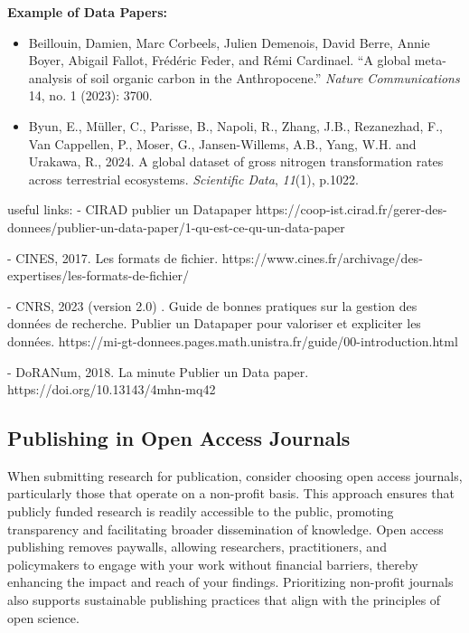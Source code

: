 \documentclass[
]{book}
\newenvironment{Shaded}{\begin{snugshade}}{\end{snugshade}}
\newcommand{\NormalTok}[1]{#1}
\begin{document}
\textbf{Example of Data Papers:}

\begin{itemize}
\item
  Beillouin, Damien, Marc Corbeels, Julien Demenois, David Berre, Annie Boyer, Abigail Fallot, Frédéric Feder, and Rémi Cardinael.
  ``A global meta-analysis of soil organic carbon in the Anthropocene.'' \emph{Nature Communications} 14, no. 1 (2023): 3700.
\item
  Byun, E., Müller, C., Parisse, B., Napoli, R., Zhang, J.B., Rezanezhad, F., Van Cappellen, P., Moser, G., Jansen-Willems, A.B., Yang, W.H.
  and Urakawa, R., 2024.
  A global dataset of gross nitrogen transformation rates across terrestrial ecosystems.
  \emph{Scientific Data}, \emph{11}(1), p.1022.
\end{itemize}

\begin{Shaded}
\begin{Highlighting}[]
\NormalTok{useful links: }
\NormalTok{{-}   CIRAD publier un Datapaper https://coop{-}ist.cirad.fr/gerer{-}des{-}donnees/publier{-}un{-}data{-}paper/1{-}qu{-}est{-}ce{-}qu{-}un{-}data{-}paper }

\NormalTok{{-}   CINES, 2017. Les formats de fichier. https://www.cines.fr/archivage/des{-}expertises/les{-}formats{-}de{-}fichier/}

\NormalTok{{-}   CNRS, 2023 (version 2.0) . Guide de bonnes pratiques sur la gestion des données de recherche. Publier un Datapaper pour valoriser et expliciter les données. https://mi{-}gt{-}donnees.pages.math.unistra.fr/guide/00{-}introduction.html}

\NormalTok{{-}   DoRANum, 2018. La minute Publier un Data paper. https://doi.org/10.13143/4mhn{-}mq42}
\end{Highlighting}
\end{Shaded}

\subsection{Publishing in Open Access Journals}\label{publishing-in-open-access-journals}

When submitting research for publication, consider choosing open access journals, particularly those that operate on a non-profit basis.
This approach ensures that publicly funded research is readily accessible to the public, promoting transparency and facilitating broader dissemination of knowledge.
Open access publishing removes paywalls, allowing researchers, practitioners, and policymakers to engage with your work without financial barriers, thereby enhancing the impact and reach of your findings.
Prioritizing non-profit journals also supports sustainable publishing practices that align with the principles of open science.
\end{document}

